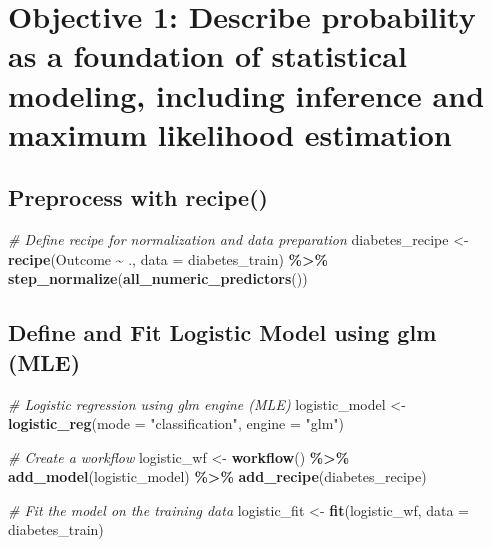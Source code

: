\documentclass[
]{article}
\newenvironment{Shaded}{\begin{snugshade}}{\end{snugshade}}
\newcommand{\AttributeTok}[1]{\textcolor[rgb]{0.13,0.29,0.53}{#1}}
\newcommand{\CommentTok}[1]{\textcolor[rgb]{0.56,0.35,0.01}{\textit{#1}}}
\newcommand{\FunctionTok}[1]{\textcolor[rgb]{0.13,0.29,0.53}{\textbf{#1}}}
\newcommand{\NormalTok}[1]{#1}
\newcommand{\OtherTok}[1]{\textcolor[rgb]{0.56,0.35,0.01}{#1}}
\newcommand{\SpecialCharTok}[1]{\textcolor[rgb]{0.81,0.36,0.00}{\textbf{#1}}}
\newcommand{\StringTok}[1]{\textcolor[rgb]{0.31,0.60,0.02}{#1}}
\begin{document}
\section{Objective 1: Describe probability as a foundation of
statistical modeling, including inference and maximum likelihood
estimation}\label{objective-1-describe-probability-as-a-foundation-of-statistical-modeling-including-inference-and-maximum-likelihood-estimation}

\subsection{Preprocess with recipe()}\label{preprocess-with-recipe}

\begin{Shaded}
\begin{Highlighting}[]
\CommentTok{\# Define recipe for normalization and data preparation}
\NormalTok{diabetes\_recipe }\OtherTok{\textless{}{-}} \FunctionTok{recipe}\NormalTok{(Outcome }\SpecialCharTok{\textasciitilde{}}\NormalTok{ ., }\AttributeTok{data =}\NormalTok{ diabetes\_train) }\SpecialCharTok{\%\textgreater{}\%}
  \FunctionTok{step\_normalize}\NormalTok{(}\FunctionTok{all\_numeric\_predictors}\NormalTok{())}
\end{Highlighting}
\end{Shaded}

\subsection{Define and Fit Logistic Model using glm
(MLE)}\label{define-and-fit-logistic-model-using-glm-mle}

\begin{Shaded}
\begin{Highlighting}[]
\CommentTok{\# Logistic regression using glm engine (MLE)}
\NormalTok{logistic\_model }\OtherTok{\textless{}{-}} \FunctionTok{logistic\_reg}\NormalTok{(}\AttributeTok{mode =} \StringTok{"classification"}\NormalTok{, }\AttributeTok{engine =} \StringTok{"glm"}\NormalTok{)}

\CommentTok{\# Create a workflow}
\NormalTok{logistic\_wf }\OtherTok{\textless{}{-}} \FunctionTok{workflow}\NormalTok{() }\SpecialCharTok{\%\textgreater{}\%}
  \FunctionTok{add\_model}\NormalTok{(logistic\_model) }\SpecialCharTok{\%\textgreater{}\%}
  \FunctionTok{add\_recipe}\NormalTok{(diabetes\_recipe)}

\CommentTok{\# Fit the model on the training data}
\NormalTok{logistic\_fit }\OtherTok{\textless{}{-}} \FunctionTok{fit}\NormalTok{(logistic\_wf, }\AttributeTok{data =}\NormalTok{ diabetes\_train)}
\end{Highlighting}
\end{Shaded}
\end{document}
